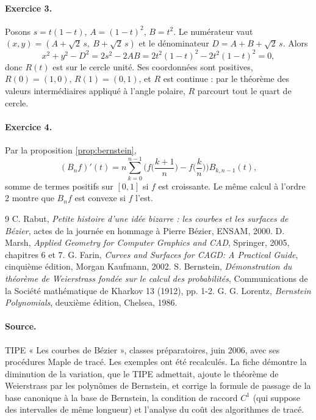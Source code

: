 \documentclass[11pt,a4paper]{article}
\theoremstyle{plain}
\theoremstyle{definition}
\theoremstyle{remark}
\begin{document}
\paragraph{Exercice 3.} Posons $s=t(1-t)$, $A=(1-t)^2$, $B=t^2$. Le numérateur vaut $(x,y)=(A+\sqrt2\,s,\ B+\sqrt2\,s)$ et le dénominateur $D=A+B+\sqrt2\,s$. Alors
\[
  x^2+y^2-D^2=2s^2-2AB=2t^2(1-t)^2-2t^2(1-t)^2=0,
\]
donc $R(t)$ est sur le cercle unité. Ses coordonnées sont positives, $R(0)=(1,0)$, $R(1)=(0,1)$, et $R$ est continue : par le théorème des valeurs intermédiaires appliqué à l'angle polaire, $R$ parcourt tout le quart de cercle.

\paragraph{Exercice 4.} Par la proposition \ref{prop:bernstein},
\[
  (B_nf)'(t)=n\sum_{k=0}^{n-1}\Big(f\Big(\frac{k+1}n\Big)-f\Big(\frac kn\Big)\Big)B_{k,n-1}(t),
\]
somme de termes positifs sur $[0,1]$ si $f$ est croissante. Le même calcul à l'ordre $2$ montre que $B_nf$ est convexe si $f$ l'est.

\begin{thebibliography}{9}
 C. Rabut, \emph{Petite histoire d'une idée bizarre : les courbes et les surfaces de Bézier}, actes de la journée en hommage à Pierre Bézier, ENSAM, 2000.
 D. Marsh, \emph{Applied Geometry for Computer Graphics and CAD}, Springer, 2005, chapitres 6 et 7.
 G. Farin, \emph{Curves and Surfaces for CAGD: A Practical Guide}, cinquième édition, Morgan Kaufmann, 2002.
 S. Bernstein, \emph{Démonstration du théorème de Weierstrass fondée sur le calcul des probabilités}, Communications de la Société mathématique de Kharkov 13 (1912), pp. 1-2.
 G. G. Lorentz, \emph{Bernstein Polynomials}, deuxième édition, Chelsea, 1986.
\end{thebibliography}

\paragraph{Source.} TIPE « Les courbes de Bézier », classes préparatoires, juin 2006, avec ses procédures Maple de tracé. Les exemples ont été recalculés. La fiche démontre la diminution de la variation, que le TIPE admettait, ajoute le théorème de Weierstrass par les polynômes de Bernstein, et corrige la formule de passage de la base canonique à la base de Bernstein, la condition de raccord $C^1$ (qui suppose des intervalles de même longueur) et l'analyse du coût des algorithmes de tracé.
\end{document}
